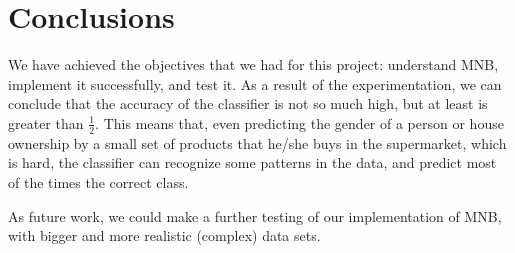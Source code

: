 \section{Conclusions}
We have achieved the objectives that we had for this project: understand MNB, implement it successfully, and test it. As a result of the experimentation, we can conclude that the accuracy of the classifier is not so much high, but at least is greater than $\frac{1}{2}$. This means that, even predicting the gender of a person or house ownership by a small set of products that he/she buys in the supermarket, which is hard, the classifier can recognize some patterns in the data, and predict most of the times the correct class.

As future work, we could make a further testing of our implementation of MNB, with bigger and more realistic (complex) data sets.